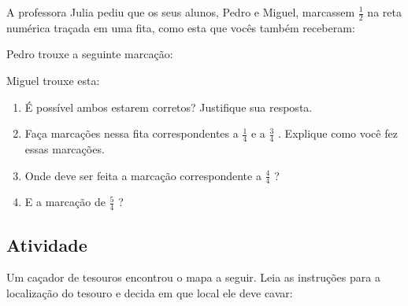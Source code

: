 A professora Julia pediu que os seus alunos, Pedro e Miguel, marcassem $\frac{1}{2}$ na reta numérica traçada em uma fita, como esta que vocês também receberam:

\begin{center}
\end{center}

Pedro trouxe a seguinte marcação: 

Miguel trouxe esta:

\begin{enumerate} [\quad a)] %
  \item     É possível ambos estarem corretos? Justifique sua resposta. 
  \item     Faça marcações nessa fita correspondentes a     $\frac{1}{4}$     e a     $\frac{3}{4}$    . Explique como você fez essas marcações.
  \item     Onde deve ser feita a marcação correspondente a     $\frac{4}{4}$    ?
  \item     E a marcação de     $\frac{5}{4}$    ? 
\end{enumerate} %

\subsection{Atividade}

Um caçador de tesouros encontrou o mapa a seguir. Leia as instruções para a localização do tesouro e decida em que local ele deve cavar:

